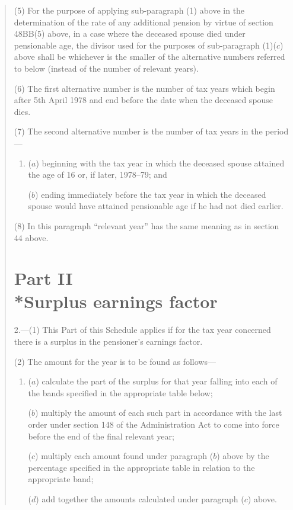 \documentclass[12pt,a4paper]{article}
\begin{document}
\begin{quotation}
(5) For the purpose of applying sub-paragraph (1)  above in the determination of the rate of any additional pension by virtue of section 48BB(5)  above, in a case where the deceased spouse died under pensionable age, the divisor used for the purposes of sub-paragraph (1)($c$)  above shall be whichever is the smaller of the alternative numbers referred to below (instead of the number of relevant years).

(6) The first alternative number is the number of tax years which begin after 5th April 1978 and end before the date when the deceased spouse dies.

(7) The second alternative number is the number of tax years in the period—
\begin{enumerate}\item[]
($a$) beginning with the tax year in which the deceased spouse attained the age of 16 or, if later, 1978--79; and

($b$) ending immediately before the tax year in which the deceased spouse would have attained pensionable age if he had not died earlier.
\end{enumerate}

(8) In this paragraph “relevant year” has the same meaning as in section 44 above.

\section*{Part II\\*Surplus earnings factor}

2.---(1) This Part of this Schedule applies if for the tax year concerned there is a surplus in the pensioner’s earnings factor.

(2) The amount for the year is to be found as follows—
\begin{enumerate}\item[]
($a$) calculate the part of the surplus for that year falling into each of the bands specified in the appropriate table below;

($b$) multiply the amount of each such part in accordance with the last order under section 148 of the Administration Act to come into force before the end of the final relevant year;

($c$) multiply each amount found under paragraph ($b$)  above by the percentage specified in the appropriate table in relation to the appropriate band;

($d$) add together the amounts calculated under paragraph ($c$)  above.
\end{enumerate}


\end{quotation}
\end{document}
